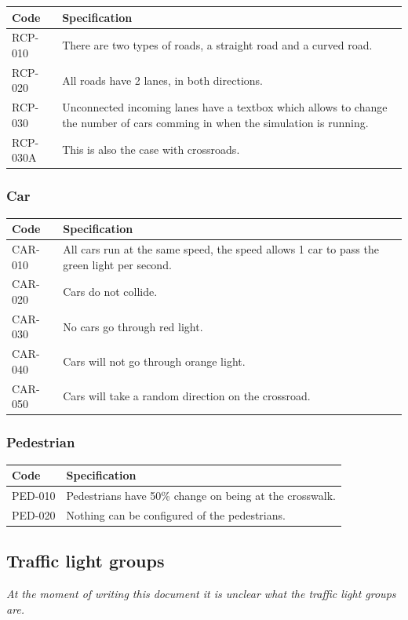 \begin{tabularx}{\textwidth}{|p{2cm}X|}\hline
	Code & Specification \\\hline
	RCP-010 & There are two types of roads, a straight road and a curved road.\\\hline
	RCP-020 & All roads have 2 lanes, in both directions.\\\hline
	RCP-030 & Unconnected incoming lanes have a textbox which allows to change the number of cars comming in when the simulation is running.\\\hline
	RCP-030A & This is also the case with crossroads.\\\hline
\end{tabularx}

\subsubsection{Car}
\begin{tabularx}{\textwidth}{|p{2cm}X|}\hline
	Code & Specification \\\hline
	CAR-010 & All cars run at the same speed, the speed allows 1 car to pass the green light per second.\\\hline
	CAR-020 & Cars do not collide.\\\hline
	CAR-030 & No cars go through red light.\\\hline
	CAR-040 & Cars will not go through orange light.\\\hline
	CAR-050 & Cars will take a random direction on the crossroad.\\\hline
\end{tabularx}

\subsubsection{Pedestrian}
\begin{tabularx}{\textwidth}{|p{2cm}X|}\hline
	Code & Specification \\\hline
	PED-010 & Pedestrians have 50\% change on being at the crosswalk.\\\hline
	PED-020 & Nothing can be configured of the pedestrians.\\\hline
\end{tabularx}

\subsection{Traffic light groups}
\textsl{At the moment of writing this document it is unclear what the traffic light groups are.}
